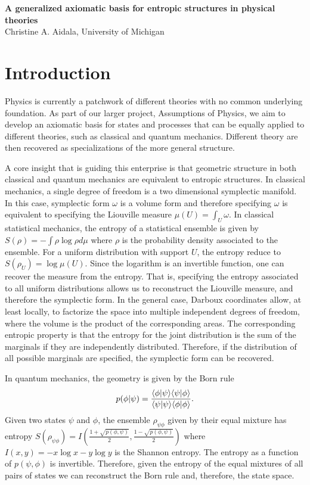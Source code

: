 \begin{center}
	\textbf{A generalized axiomatic basis for entropic structures in physical theories} \\
	Christine A. Aidala, University of Michigan
\end{center}

\section{Introduction}

Physics is currently a patchwork of different theories with no common underlying foundation. As part of our larger project, Assumptions of Physics, we aim to develop an axiomatic basis for states and processes that can be equally applied to different theories, such as classical and quantum mechanics. Different theory are then recovered as specializations of the more general structure.

A core insight that is guiding this enterprise is that geometric structure in both classical and quantum mechanics are equivalent to entropic structures. In classical mechanics, a single degree of freedom is a two dimensional symplectic manifold. In this case, symplectic form $\omega$ is a volume form and therefore specifying $\omega$ is equivalent to specifying the Liouville measure $\mu(U) = \int_U \omega$. In classical statistical mechanics, the entropy of a statistical ensemble is given by $S(\rho) = - \int \rho \log \rho d\mu$ where $\rho$ is the probability density associated to the ensemble. For a uniform distribution with support $U$, the entropy reduce to $S(\rho_U) = \log \mu(U)$. Since the logarithm is an invertible function, one can recover the measure from the entropy. That is, specifying the entropy associated to all uniform distributions allows us to reconstruct the Liouville measure, and therefore the symplectic form. In the general case, Darboux coordinates allow, at least locally, to factorize the space into multiple independent degrees of freedom, where the volume is the product of the corresponding areas. The corresponding entropic property is that the entropy for the joint distribution is the sum of the marginals if they are independently distributed. Therefore, if the distribution of all possible marginals are specified, the symplectic form can be recovered.

In quantum mechanics, the geometry is given by the Born rule
\begin{equation}
	p(\phi|\psi) = \frac{\langle \phi | \psi \rangle\langle \psi | \phi \rangle}{\langle \psi | \psi \rangle\langle \phi | \phi \rangle}.
\end{equation}
Given two states $\psi$ and $\phi$, the ensemble $\rho_{\psi\phi}$ given by their equal mixture has entropy $S(\rho_{\psi\phi}) = I\left(\frac{1 + \sqrt{p(\phi,\psi)}}{2},\frac{1 - \sqrt{p(\phi,\psi)}}{2} \right)$ where $I(x,y) = -x \log x -y \log y$ is the Shannon entropy. The entropy as a function of $p(\psi,\phi)$ is invertible. Therefore, given the entropy of the equal mixtures of all pairs of states we can reconstruct the Born rule and, therefore, the state space.

